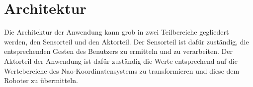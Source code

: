 \section{Architektur}
Die Architektur der Anwendung kann grob in zwei Teilbereiche gegliedert werden, den Sensorteil und den Aktorteil.
Der Sensorteil ist dafür zuständig, die entsprechenden Gesten des Benutzers zu ermitteln und zu verarbeiten. Der Aktorteil der Anwendung ist dafür zuständig die Werte entsprechend auf die Wertebereiche des Nao-Koordinatensystems zu transformieren und diese dem Roboter zu übermitteln.


